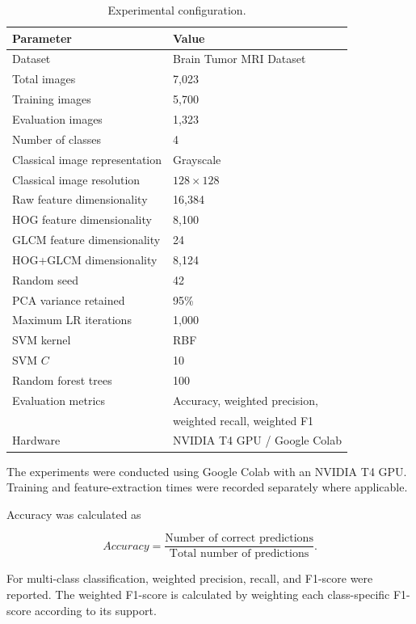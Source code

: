 \documentclass[11pt,a4paper]{article}
\begin{document}
\begin{table}[H]
\centering
\caption{Experimental configuration.}
\label{tab:experimental_setup}
\begin{tabular}{ll}
\toprule
\textbf{Parameter} & \textbf{Value} \\
\midrule
Dataset & Brain Tumor MRI Dataset \\
Total images & 7,023 \\
Training images & 5,700 \\
Evaluation images & 1,323 \\
Number of classes & 4 \\
Classical image representation & Grayscale \\
Classical image resolution & $128 \times 128$ \\
Raw feature dimensionality & 16,384 \\
HOG feature dimensionality & 8,100 \\
GLCM feature dimensionality & 24 \\
HOG+GLCM dimensionality & 8,124 \\
Random seed & 42 \\
PCA variance retained & 95\% \\
Maximum LR iterations & 1,000 \\
SVM kernel & RBF \\
SVM $C$ & 10 \\
Random forest trees & 100 \\
Evaluation metrics & Accuracy, weighted precision, \\
& weighted recall, weighted F1 \\
Hardware & NVIDIA T4 GPU / Google Colab \\
\bottomrule
\end{tabular}
\end{table}

The experiments were conducted using Google Colab with an NVIDIA T4 GPU. Training and feature-extraction times were recorded separately where applicable.

Accuracy was calculated as

\begin{equation}
Accuracy =
\frac{\text{Number of correct predictions}}
{\text{Total number of predictions}}.
\end{equation}

For multi-class classification, weighted precision, recall, and F1-score were reported. The weighted F1-score is calculated by weighting each class-specific F1-score according to its support.
\end{document}
